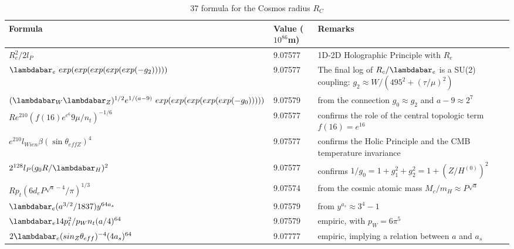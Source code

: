 \documentclass[a4paper,9pt]{article}
\newcounter{col}
\begin{document}
\begin{table}
\caption[Table \ref{CosmosTable}: 37 Cosmos radius formula]{37 formula for the Cosmos radius $R_C$}
\label{CosmosTable}
  \hskip-2.0cm\begin{tabular}{lll}
    \toprule
    \cmidrule(r){1-3}
    Formula     & Value ($10^{86}$m)  & Remarks \\
   \midrule
 
 $ R_e^2/2l_P $ & 9.07577 & 1D-2D Holographic Principle with $R_e$ \cite{Sanchez2}   \\
 
 $ \lambdabar_e ~ exp(exp(exp(exp(exp(-g_2)))))  $ & 9.07577 & The final log of $R_c/\lambdabar_e$ is a SU(2) coupling: $g_2 \approx W/(495^2+(\tau/\mu)^2)$  \\
 
 $ (\lambdabar_{W}\lambdabar_{Z})^{1/2}e^{1/(a-9)} ~ exp(exp(exp(exp(exp(-g_0)))))  $ & 9.07579 & from the connection $g_0 \approx g_2$ and $a - 9 \approx 2^7$ \\
 
 
 $ R e^{210} (f(16) e^{e^6} 9\mu/n_t)^{-1/6}  $ & 9.07577 & confirms the role of the central topologic term $f(16) = e^{16}$   \\
 
 $e^{210}l_{Wien}\beta (\sin \theta_{effZ})^4$ & 9.07577 & confirms the Holic Principle and the CMB temperature invariance  \\
 
 $ 2^{128} l_P (g_0R/\lambdabar_H)^2 $ & 9.07577 & confirms $1/g_0 = 1+g_1^2 +g_2^2 = 1 + (Z/H^{(0)})^2$  \\
 
 
 
 
 $ Rp_t (6d_e P^{\sqrt a - 4}/\pi)^{1/3}$ & 9.07574 & from the cosmic atomic mass $M_c/m_H \approx P^{\sqrt a}$  \\
 
 
  $ \lambdabar_{e} (a^{3/2}/1837) y^{64a_s}$ & 9.07579 & from $y^{a_s} \approx 3^4 - 1$ \\
 
 $ \lambdabar_{e} 14 p_t^2/p_Wn_t (a/4)^{64}$ & 9.07579 & empiric, with $p_W = 6\pi^5$ \\
 
 $ 2\lambdabar_{e} (sin_Z \theta_{eff})^{-4} (4a_s)^{64}$ & 9.07777 & empiric, implying a relation between $a$ and $a_s$ \\
 

\end{tabular}
\end{table}
\end{document}
